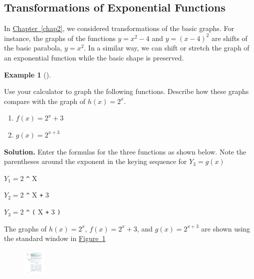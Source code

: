 \documentclass[10pt,]{book}
\theoremstyle{plain}
\theoremstyle{definition}
\theoremstyle{definition}
\theoremstyle{definition}
\newtheorem{example}[theorem]{Example}
\theoremstyle{definition}
\theoremstyle{definition}
\numberwithin{equation}{section}
\begin{document}
\subsection[Transformations of Exponential Functions]{Transformations of Exponential Functions}\label{subsection-92}

	In \hyperref[chap2]{Chapter~\ref{chap2}}, we considered transformations of the basic graphs. For instance, the graphs of the functions \(y = x^2 − 4\) and \(y = (x − 4)^2\) are shifts of the basic parabola, \(y = x^2\). In a similar way, we can shift or stretch the graph of an exponential function while the basic shape is preserved.
%
\begin{example}[]\label{example-GC-shift-exponentials}

	Use your calculator to graph the following functions. Describe how these graphs compare with the graph of \(h(x) = 2^x\).
	\leavevmode%
\begin{enumerate}[label=*\alph**]
\item\hypertarget{li-663}{}\(f (x) = 2^x + 3\)\item\hypertarget{li-664}{}\(g(x) = 2^{x+3}\)\end{enumerate}

%
\par\medskip\noindent%
\textbf{Solution.}\quad 
	Enter the formulas for the three functions as shown below. Note the parentheses around the exponent in the keying sequence for \(Y_3 = g(x)\)
%
\par

	\(Y_1 = 2 \) \lstinline?^? X 
%
\par

	\(Y_2 = 2 \) \lstinline?^? X \lstinline?+? 3
%
\par

	\(Y_3 = 2 \) \lstinline?^? \lstinline?(? X \lstinline?+? 3 \lstinline?)?
%
\par

	The graphs of \(h(x) = 2^x\), \(f(x) = 2^x + 3\), and \(g(x) = 2^{x+3}\) are shown using the standard window in \hyperref[fig-GC-exponential-growth]{Figure~\ref{fig-GC-exponential-growth}}
	\leavevmode%
\begin{figure}
\centering
\includegraphics[width=0.100\textwidth,]{images/fig-GC-exponential-growth.pdf}\caption{\label{fig-GC-exponential-growth}}
\end{figure}


\end{example}
\end{document}
